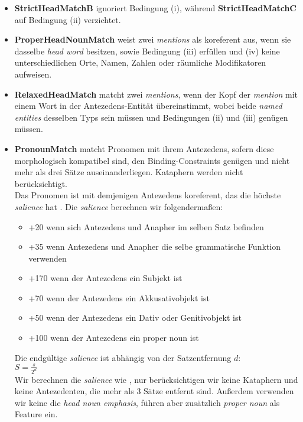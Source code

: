 \documentclass{scrartcl}
\begin{document}
\begin{itemize}
\item \textbf{StrictHeadMatchB} ignoriert Bedingung (i), während \textbf{StrictHeadMatchC}  auf Bedingung (ii) verzichtet.

\item \textbf{ProperHeadNounMatch} weist zwei \textit{mentions} als koreferent aus, wenn sie dasselbe \textit{head word} besitzen, sowie Bedingung (iii) erfüllen und (iv) keine unterschiedlichen Orte, Namen, Zahlen oder räumliche Modifikatoren aufweisen.

\item \textbf{RelaxedHeadMatch} matcht zwei \textit{mentions}, wenn der Kopf der \textit{mention} mit einem Wort in der Antezedens-Entität übereinstimmt, wobei beide \textit{named entities} desselben Typs sein müssen und Bedingungen (ii) und (iii) genügen müssen.

\item \textbf{PronounMatch} matcht Pronomen mit ihrem Antezedens, sofern diese morphologisch kompatibel sind, den Binding-Constraints genügen und nicht mehr als drei Sätze auseinanderliegen. Kataphern werden nicht berücksichtigt. \\
Das Pronomen ist mit demjenigen Antezedens koreferent, das die höchste \textit{salience} hat \cite{wunsch2006}. Die \textit{salience} berechnen wir folgendermaßen:

\begin{itemize}[]
	\item +20 wenn sich  Antezedens und Anapher im selben Satz befinden
	\item +35 wenn Antezedens und Anapher die selbe grammatische Funktion verwenden
	\item +170 wenn der Antezedens ein Subjekt ist
	\item +70 wenn der Antezedens ein Akkusativobjekt ist
	\item +50 wenn der Antezedens ein Dativ oder Genitivobjekt ist
	\item +100 wenn der Antezedens ein proper noun ist
\end{itemize}

Die endgültige \textit{salience} ist abhängig von der Satzentfernung $d$: \\
$S = \frac{s}{2^d}$ \\
Wir berechnen die \textit{salience} wie , nur berücksichtigen wir keine Kataphern und keine Antezedenten, die mehr als 3 Sätze entfernt sind. Außerdem verwenden wir keine die \textit{head noun emphasis}, führen aber zusätzlich \textit{proper noun} als Feature ein.  
\end{itemize}
\end{document}
